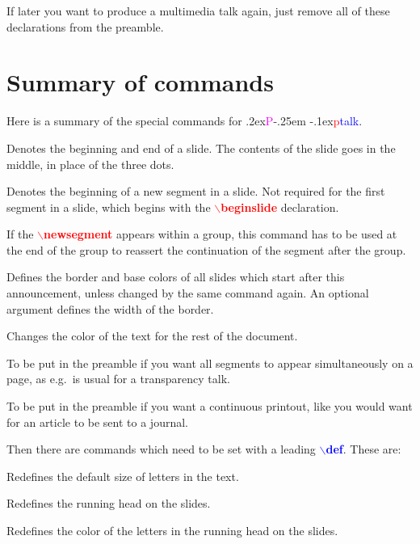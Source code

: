 \documentclass[12pt]{article}
\def\pptalk{{
\raise.2ex\hbox{\textcolor{magenta}P}\kern-.25em
\raise-.1ex\hbox{\textcolor{red}p}\textcolor{blue}{talk}}}
\def\ecomm#1{{\textcolor{blue}{$\backslash${\bf #1}}}}
\def\comm#1{{\textcolor{red}{$\backslash${\bf #1}}}}
\begin{document}
If later you want to produce a multimedia talk again, just remove all 
of these declarations from the preamble.

\endslide


\beginslide
\section{Summary of commands}
%
Here is a summary of the special commands for \pptalk.
%
\begin{list}{}{}
\item[\comm{beginslide}$\,\cdots\,$\comm{endslide}] Denotes the
beginning and end of a slide.  The contents of the slide goes in the
middle, in place of the three dots.

\item[\comm{newsegment}] Denotes the beginning of a new segment in a
slide.  Not required for the first segment in a slide, which begins
with the \comm{beginslide} declaration.

\item[\comm{samesegment}] If the \comm{newsegment} appears within a
group, this command has to be used at the end of the group to reassert
the continuation of the segment after the group.

\item[\comm{slidebox}] Defines the border and base colors of all
slides which start after this announcement, unless changed by the same
command again.  An optional argument defines the width of the border.

\item[\comm{Color}] Changes the color of the text for the rest of the
document.

\item[\comm{transparency}] To be put in the preamble if you 
want all segments to appear simultaneously on a page, as e.g.\ is
usual for a transparency talk.

\item[\comm{onpaper}] To be put in the preamble if you want a
continuous printout, like you would want for an article to be sent to
a journal.

\end{list}

\endslide

\beginslide

Then there are commands which need to be set with a leading
\ecomm{def}.  These are:
%
\begin{list}{}{}
\item[\ecomm{def}\comm{defaultsize}] Redefines the default size of
  letters in the text.

\item[\ecomm{def}\comm{runningheadtext}] Redefines the running head on
  the slides.

\item[\ecomm{def}\comm{runningheadcolor}] Redefines the color of the
  letters in the running head on the slides.

\end{list}
\end{document}
